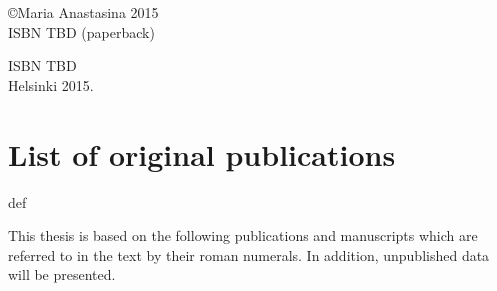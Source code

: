 \documentclass[a4paper,12pt]{article} %
\providecommand{\phantomsection}{def} %
\begin{document}
\begin{singlespace}
\vspace{1.5 cm}

\copyright Maria Anastasina 2015 \\


ISBN TBD (paperback)

ISBN TBD \\

Helsinki 2015.
\end{singlespace}



\cleardoublepage
{}
\tableofcontents
\cleardoublepage
{}


\section*{List of original publications}
\phantomsection %

This thesis is based on the following publications and manuscripts which are referred to in the text by their roman numerals. In addition, unpublished data will be presented.
\end{document}
